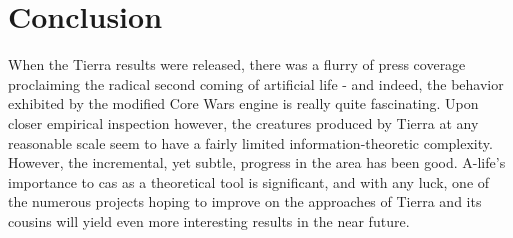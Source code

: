 \documentclass[11pt, twocolumn]{article}
\begin{document}
\section{Conclusion}
When the Tierra results were released, there was a flurry of press coverage proclaiming the radical second coming of artificial life - and indeed, the behavior exhibited by the modified Core Wars engine is really quite fascinating. Upon closer empirical inspection however, the creatures produced by Tierra at any reasonable scale seem to have a fairly limited information-theoretic complexity. However, the incremental, yet subtle, progress in the area has been good. A-life's importance to cas as a theoretical tool is significant, and with any luck, one of the numerous projects hoping to improve on the approaches of Tierra and its cousins will yield even more interesting results in the near future.

\pagebreak

\end{document}
